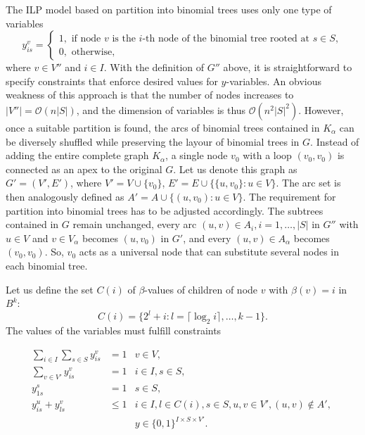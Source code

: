 The ILP model based on partition into binomial trees uses only one type of variables
$$
y_{is}^v=\begin{cases}
1, \text{ if  node } v \text{ is the } i\text{-th node of the binomial tree rooted at } s\in S,\\
0, \text{ otherwise},
\end{cases}
$$
where $v\in V''$ and $i\in I $. 
With the definition of $G''$ above, it is straightforward to specify constraints that enforce desired values for $y$-variables.
An obvious weakness of this approach is  that the number of nodes increases to $|V''|=\mathcal{O}(n|S|)$, and the dimension of variables is thus $\mathcal{O}(n^2|S|^2)$.
However, once a suitable partition is found, the arcs of binomial trees contained in $K_\alpha$ can be diversely shuffled while preserving the layour of binomial trees in $G$.
Instead of adding the entire complete graph $K_\alpha$, a single node $v_0$ with a loop $(v_0,v_0)$ is connected as an apex to the original $G$.
Let us denote this graph as $G'=(V',E')$, where $V'=V\cup\{v_0\}$, $E'=E\cup\{\{u,v_0\}:u\in V\}$. The arc set is then analogously defined as $A'=A\cup\{(u,v_0): u\in V\}$.
The requirement for partition into binomial trees has to be adjusted accordingly.
The subtrees contained in $G$ remain unchanged, every arc $(u,v)\in A_i, i=1,\dots,|S|$ in $G''$ with $u\in V$ and $v\in V_\alpha$ becomes $(u,v_0)$ in $G'$,
and every $(u,v)\in A_\alpha$ becomes $(v_0,v_0)$.
So, $v_0$ acts as a universal node that can substitute several nodes in each binomial tree.

Let us define the set $C(i)$ of $\beta$-values of children of node $v$ with $\beta(v)=i$ in $B^k$:
\begin{equation}
C(i)=\{2^l+i:l=\lceil\log_2 i\rceil,\dots,k-1\}.
\end{equation}
The values of the variables must fulfill constraints

\begin{subequations}\label{mod:partition}
\begin{align}
\label{mod:part:nodeBelongs} \sum\limits_{i\in I}\sum\limits_{s\in S}y^v_{is} & = 1 & v\in V,\\
\label{mod:part:treeHasIJ} \sum\limits_{v\in V'}y^v_{is} & = 1 & i\in I,s\in S,\\
\label{mod:part:source1} y_{1s}^s & = 1  & s\in S,\\
\label{mod:part:followArcs} y^u_{is}+y^v_{ls} &\leq 1 & i\in I,l\in C(i), s\in S, u,v\in V',(u,v)\not\in A',\\
\label{mod:part:dim}&&y \in \{0,1\}^{I\times S\times V'}.
\end{align}~
\end{subequations}

